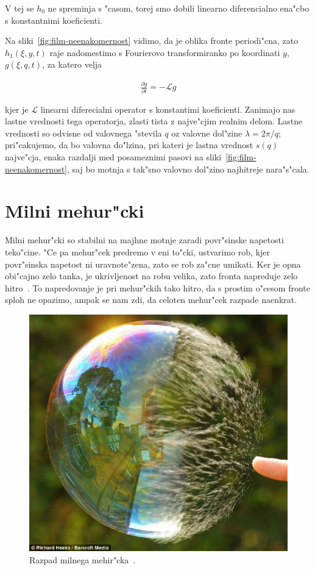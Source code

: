\documentclass[a4paper,10pt]{article}
\newcommand{\odv}[1]{\frac{\partial #1}{\partial t}}
\begin{document}
V tej se $h_0$ ne spreminja s "casom, torej smo dobili linearno diferencialno ena"cbo s konstantnimi koeficienti. 

Na sliki~\ref{fig:film-neenakomernost} vidimo, da je oblika fronte periodi"cna, zato $h_1(\xi, y, t)$ raje nadomestimo s Fourierovo transformiranko po koordinati $y$, $g(\xi, q, t)$, za katero velja

\begin{align}
 \odv{g} = -\mathcal{L}g
\end{align}

kjer je $\mathcal{L}$ linearni diferecialni operator s konstantimi koeficienti. Zanimajo nas lastne vrednosti tega operatorja, zlasti tista z najve"cjim realnim delom. Lastne vrednosti so odvisne od valovnega "stevila $q$ oz valovne dol"zine $\lambda = 2\pi/q$; pri"cakujemo, da bo valovna do"lzina, pri kateri je lastna vrednost $s(q)$ najve"cja, enaka razdalji med posameznimi pasovi na sliki~\ref{fig:film-neenakomernost}, saj bo motnja s tak"sno valovno dol"zino najhitreje nara"s"cala. 

\section{Milni mehur"cki}

Milni mehur"cki so stabilni na majhne motnje zaradi povr"sinske napetosti teko"cine. "Ce pa mehur"cek predremo v eni to"cki, ustvarimo rob, kjer povr"sinska napetost ni uravnote"zena, zato se rob za"cne umikati. Ker je opna obi"cajno zelo tanka, 
je ukrivljenost na robu velika, zato fronta napreduje zelo hitro~\cite{diploma}. To napredovanje je pri mehur"ckih tako hitro, da s prostim o"cesom fronte sploh ne opazimo, ampak se nam zdi, da celoten mehur"cek razpade naenkrat. 
 
\begin{figure}[h]
 \centering
\includegraphics[width=.8\textwidth]{./Slike/bubble-3}
\caption{Razpad milnega mehir"cka~\cite{slike-mehurcek}. }
\label{fig:mehurcek-3}
\end{figure}
\end{document}
